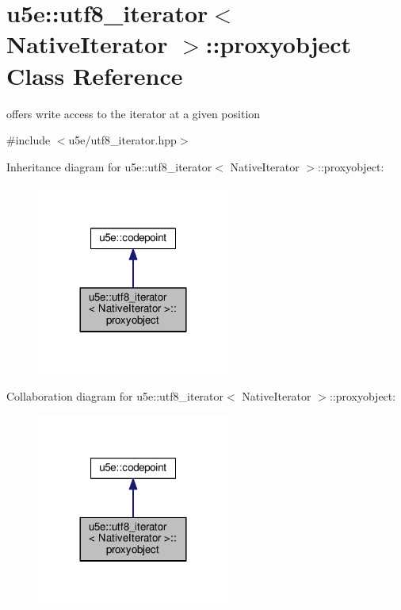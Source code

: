 \hypertarget{classu5e_1_1utf8__iterator_1_1proxyobject}{}\section{u5e\+:\+:utf8\+\_\+iterator$<$ Native\+Iterator $>$\+:\+:proxyobject Class Reference}
\label{classu5e_1_1utf8__iterator_1_1proxyobject}


offers write access to the iterator at a given position  




{\ttfamily \#include $<$u5e/utf8\+\_\+iterator.\+hpp$>$}



Inheritance diagram for u5e\+:\+:utf8\+\_\+iterator$<$ Native\+Iterator $>$\+:\+:proxyobject\+:
\nopagebreak
\begin{figure}[H]
\begin{center}
\leavevmode
\includegraphics[width=180pt]{classu5e_1_1utf8__iterator_1_1proxyobject__inherit__graph}
\end{center}
\end{figure}


Collaboration diagram for u5e\+:\+:utf8\+\_\+iterator$<$ Native\+Iterator $>$\+:\+:proxyobject\+:
\nopagebreak
\begin{figure}[H]
\begin{center}
\leavevmode
\includegraphics[width=180pt]{classu5e_1_1utf8__iterator_1_1proxyobject__coll__graph}
\end{center}
\end{figure}
